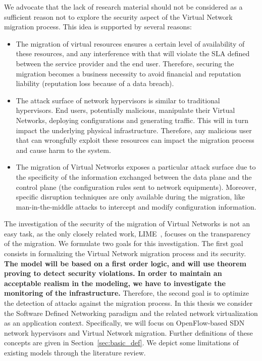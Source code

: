 We advocate that the lack of research material should not be considered as a sufficient reason not to explore the security aspect of the Virtual Network migration process. This idea is supported by several reasons:

\begin{itemize}
    
    \item The migration of virtual resources ensures a certain level of availability of these resources, and any interference with that will violate the SLA defined between the service provider and the end user.
    Therefore, securing the migration becomes a business necessity to avoid financial and reputation liability (\eg reputation loss because of a data breach).
    
    \item The attack surface of network hypervisors is similar to traditional hypervisors. End users, potentially malicious, manipulate their Virtual Networks, deploying configurations and generating traffic. This will in turn impact the underlying physical infrastructure. Therefore, any malicious user that can wrongfully exploit these resources can impact the migration process and cause harm to the system.

    \item The migration of Virtual Networks exposes a particular attack surface due to the specificity of the information exchanged between the data plane and the control plane (\eg the configuration rules sent to network equipments). Moreover, specific disruption techniques are only available during the migration, like man-in-the-middle attacks to intercept and modify configuration information.  
\end{itemize}

The investigation of the security of the migration of Virtual Networks is not an easy task, as the only closely related work, LIME~\cite{Lime-Ghorbani2014}, focuses on the transparency of the migration. 
We formulate two goals for this investigation.
The first goal consists in formalizing the Virtual Network migration process and its security.
\textbf{The model will be based on a first order logic, and will use theorem proving to detect security violations. In order to maintain an acceptable realism in the modeling, we have to investigate the monitoring of the infrastructure.}
Therefore, the second goal is to optimize the detection of attacks against the migration process. In this thesis we consider the Software Defined Networking paradigm and the related network virtualization as an application context. Specifically, we will focus on OpenFlow-based SDN network hypervisors and Virtual Network migration. Further definitions of these concepts are given in Section~\ref{sec:basic_def}. 
We depict some limitations of existing models through the literature review.


